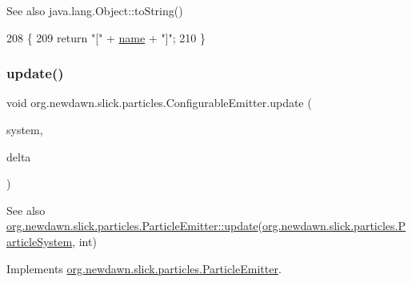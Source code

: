 \begin{DoxySeeAlso}{See also}
java.\+lang.\+Object\+::to\+String() 
\end{DoxySeeAlso}

\begin{DoxyCode}
208                              \{
209         \textcolor{keywordflow}{return} \textcolor{stringliteral}{"["} + \mbox{\hyperlink{classorg_1_1newdawn_1_1slick_1_1particles_1_1_configurable_emitter_af63b15389d206c6318e14ff4bc909ac0}{name}} + \textcolor{stringliteral}{"]"};
210     \}
\end{DoxyCode}
\mbox{\label{classorg_1_1newdawn_1_1slick_1_1particles_1_1_configurable_emitter_a982eeb3a795db37d7065e8b20868281c}} 
\subsubsection{\texorpdfstring{update()}{update()}}
{\footnotesize\ttfamily void org.\+newdawn.\+slick.\+particles.\+Configurable\+Emitter.\+update (\begin{DoxyParamCaption}\item[{\mbox{\hyperlink{classorg_1_1newdawn_1_1slick_1_1particles_1_1_particle_system}{Particle\+System}}}]{system,  }\item[{int}]{delta }\end{DoxyParamCaption})\hspace{0.3cm}{\ttfamily [inline]}}

\begin{DoxySeeAlso}{See also}
\mbox{\hyperlink{interfaceorg_1_1newdawn_1_1slick_1_1particles_1_1_particle_emitter_a18e2a8e6264aa46fb874f992c2093e15}{org.\+newdawn.\+slick.\+particles.\+Particle\+Emitter\+::update}}(\mbox{\hyperlink{classorg_1_1newdawn_1_1slick_1_1particles_1_1_particle_system}{org.\+newdawn.\+slick.\+particles.\+Particle\+System}}, int) 
\end{DoxySeeAlso}


Implements \mbox{\hyperlink{interfaceorg_1_1newdawn_1_1slick_1_1particles_1_1_particle_emitter_a18e2a8e6264aa46fb874f992c2093e15}{org.\+newdawn.\+slick.\+particles.\+Particle\+Emitter}}.


